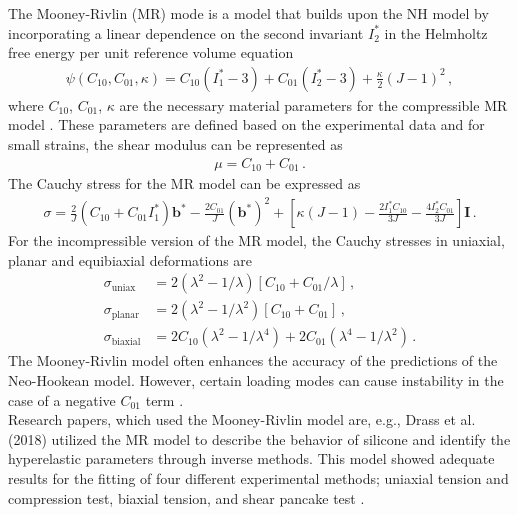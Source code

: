The Mooney-Rivlin (MR) mode is a model that builds upon the NH model by incorporating a linear dependence on the 
second invariant $I_2^*$ in the Helmholtz free energy per unit reference volume equation 
\begin{align}
        \psi(C_{10}, C_{01}, \kappa) = C_{10}(I_1^* - 3) + C_{01}(I_2^* - 3) + \frac{\kappa}{2}(J-1)^2 \, ,
        \label{eq:helmholtzMR}
\end{align}
where $C_{10}$, $C_{01}$, $\kappa$ are the necessary material parameters for the compressible MR model \cite{Bergström2015}.
These parameters are defined based on the experimental data and for small strains, the shear modulus can be represented as \cite{Youssef2022}
\begin{align}
        \mu = C_{10} + C_{01} \, .
        \label{eq:constantsMR}
\end{align}
The Cauchy stress for the MR model can be expressed as 
\begin{align}
        \sigma = \frac{2}{J}(C_{10} + C_{01}I_1^*)\boldsymbol{b}^* - \frac{2C_{01}}{J}(\boldsymbol{b}^*)^2 + [\kappa(J-1) - \frac{2I_1^* C_{10}}{3J} - \frac{4I_2^* C_{01}}{3J}]\boldsymbol{I} \, .
        \label{eq:cauchystressMR}
\end{align}
For the incompressible version of the MR model, the Cauchy stresses in uniaxial, planar and equibiaxial deformations are 
\begin{align}
        \sigma_{\text{uniax}} &= 2(\lambda^2 - 1/\lambda)[C_{10} + C_{01}/\lambda] \, , \label{eq:uniaxMR} \\
        \sigma_{\text{planar}} &= 2(\lambda^2 - 1/\lambda^2)[C_{10} + C_{01}] \, , \label{eq:planarMR} \\
        \sigma_{\text{biaxial}} &= 2C_{10}(\lambda^2 - 1/\lambda^4) + 2C_{01}(\lambda^4 - 1/\lambda^2) \, . \label{eq:biaxialMR}
\end{align}
The Mooney-Rivlin model often enhances the accuracy of the predictions of the Neo-Hookean model.
However, certain loading modes can cause instability in the case of a negative $C_{01}$ term \cite{Bergström2015}.\\

Research papers, which used the Mooney-Rivlin model are, e.g., Drass et al. (2018) utilized the MR 
model to describe the behavior of silicone and identify the hyperelastic parameters through inverse methods. This model 
showed adequate results for the fitting of four different experimental methods; uniaxial tension and compression test, 
biaxial tension, and shear pancake test \cite{Drass2018}.

